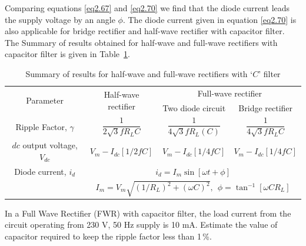Comparing equations \eqref{eq2.67} and \eqref{eq2.70} we find that the
diode current leads the supply voltage by an angle $\phi$. The diode
current given in equation \eqref{eq2.70} is also applicable for bridge
rectifier and half-wave rectifier with capacitor filter. The Summary
of results obtained for half-wave and full-wave rectifiers with
capacitor filter is given in Table~\ref{tab2.5}.
\begin{table}[H]
\centering
\renewcommand{\arraystretch}{1.6}
\tabcolsep=6pt
\caption{Summary of results for half-wave and full-wave
rectifiers with `$C$' filter}\label{tab2.5}
\begin{tabular}{|c|c|c|c|}
\hline
\multirow{2}{1.5cm}{Parameter\index{Rectifier!parameter}} & \multirow{2}{2cm}{Half-wave
  rectifier} &  \multicolumn{2}{c|}{Full-wave rectifier}\\\cline{3-4}
 & & Two diode circuit & Bridge rectifier\\
\hline
Ripple Factor, $\gamma$ & $\dfrac{1}{2\sqrt{3} f R_L C}$ &
$\dfrac{1}{4 \sqrt{3} f R_L(C)}$ & $\dfrac{1}{4 \sqrt{3} f R_L C}$\\[8pt]
\hline
$dc$ output voltage, $V_{dc}$ & $V_m - I_{dc} [1/2 f C]$ & $V_m -
I_{dc} [1/4 f C]$ & $V_m -I_{dc} [1/4 f C]$\\[2pt]
\hline
Diode current, $i_d$ & \multicolumn{3}{c|}{$i_d = I_m \sin [\omega t +
  \phi]$}\\[2pt]
&  \multicolumn{3}{c|}{$I_m = V_m \sqrt{(1/R_L)^2 + (\omega C)^2}, ~~
  \phi = \tan^{-1} [\omega C R_L]$}\\
\hline
\end{tabular}
\end{table}

\begin{example}\label{exam2.16}
In a Full Wave Rectifier (FWR) with capacitor filter, the load current
from the circuit operating from 230 V, 50 Hz supply is 10 mA. Estimate
the value of capacitor required to keep the ripple factor less than 1\,\%. 
\end{example}

